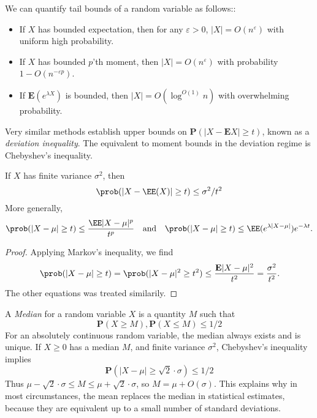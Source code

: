 We can quantify tail bounds of a random variable as follows::
%
\begin{itemize}
    \item If $X$ has bounded expectation, then for any $\varepsilon > 0$, $|X| = O(n^\varepsilon)$ with uniform high probability.

    \item If $X$ has bounded $p$'th moment, then $|X| = O(n^\varepsilon)$ with probability $1 - O(n^{-\varepsilon p})$.

    \item If $\mathbf{E}(e^{\lambda X})$ is bounded, then $|X| = O(\log^{O(1)} n)$ with overwhelming probability.
\end{itemize}
%
Very similar methods establish upper bounds on $\mathbf{P}(|X - \mathbf{E} X| \geq t)$, known as a {\it deviation inequality}. The equivalent to moment bounds in the deviation regime is Chebyshev's inequality.

\begin{theorem}
    If $X$ has finite variance $\sigma^2$, then
    \[ \prob(|X - \EE(X)| \geq t) \leq \sigma^2 / t^2 \]
    More generally,
    \[ \prob(|X - \mu| \geq t) \leq \frac{\EE |X - \mu|^p}{t^p} \quad \text{and} \quad \prob(|X-\mu| \geq t) \leq \EE(e^{\lambda |X - \mu|}) e^{- \lambda t}. \]
\end{theorem}
\begin{proof}
    Applying Markov's inequality, we find
    \[ \prob(|X - \mu| \geq t) = \prob(|X - \mu|^2 \geq t^2) \leq \frac{\mathbf{E}|X - \mu|^2}{t^2} = \frac{\sigma^2}{t^2}. \]
    The other equations was treated similarily.
\end{proof}

\begin{example}
    A {\it Median} for a random variable $X$ is a quantity $M$ such that
    \[ \mathbf{P}(X \geq M), \mathbf{P}(X \leq M) \leq 1/2 \]
    For an absolutely continuous random variable, the median always exists and is unique. If $X \geq 0$ has a median $M$, and finite variance $\sigma^2$, Chebyshev's inequality implies
    \[ \mathbf{P}(|X - \mu| \geq \sqrt{2} \cdot \sigma) \leq 1/2 \]
    Thus $\mu - \sqrt{2} \cdot \sigma \leq M \leq \mu + \sqrt{2} \cdot \sigma$, so $M = \mu + O(\sigma)$. This explains why in most circumstances, the mean replaces the median in statistical estimates, because they are equivalent up to a small number of standard deviations.
\end{example}

